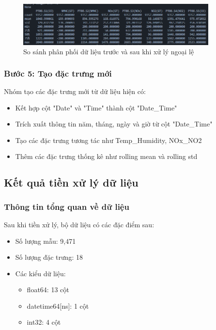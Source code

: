 \begin{figure}[h]
    \centering
    \includegraphics[width=0.9\textwidth]{images/data_distribution_comparison.png}
    \caption{So sánh phân phối dữ liệu trước và sau khi xử lý ngoại lệ}
    \label{fig:data_distribution}
\end{figure}

\subsubsection{Bước 5: Tạo đặc trưng mới}
\hspace{0.5cm}Nhóm tạo các đặc trưng mới từ dữ liệu hiện có:
\begin{itemize}
    \item Kết hợp cột "Date" và "Time" thành cột "Date\_Time"
    \item Trích xuất thông tin năm, tháng, ngày và giờ từ cột "Date\_Time"
    \item Tạo các đặc trưng tương tác như Temp\_Humidity, NOx\_NO2
    \item Thêm các đặc trưng thống kê như rolling mean và rolling std
\end{itemize}

\subsection{Kết quả tiền xử lý dữ liệu}

\subsubsection{Thông tin tổng quan về dữ liệu}
\hspace{0.5cm}Sau khi tiền xử lý, bộ dữ liệu có các đặc điểm sau:
\begin{itemize}
    \item Số lượng mẫu: 9,471
    \item Số lượng đặc trưng: 18
    \item Các kiểu dữ liệu:
    \begin{itemize}
        \item float64: 13 cột
        \item datetime64[ns]: 1 cột
        \item int32: 4 cột
    \end{itemize}
\end{itemize}

